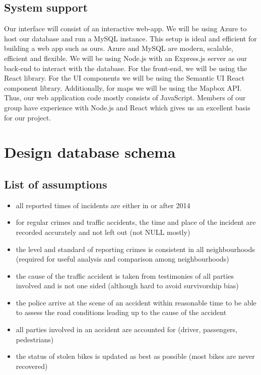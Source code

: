 \documentclass[12pt, a4paper]{article}
\begin{document}
\subsection*{System support}
Our interface will consist of an interactive web-app. We will be using Azure to host our database and run a MySQL instance. This setup is ideal and efficient for building a web app such as ours. Azure and MySQL are modern, scalable, efficient and flexible. We will be using Node.js with an Express.js server as our back-end to interact with the database. For the front-end, we will be using the React library. \color{blue}For the UI components we will be using the Semantic UI React component library. Additionally, for maps we will be using the Mapbox API. \color{black}Thus, our web application code mostly consists of JavaScript. Members of our group have experience with Node.js and React which gives us an excellent basis for our project. 

\section*{Design database schema}
\subsection*{List of assumptions}
\begin{itemize}
    \item all reported times of incidents are either in or after 2014
    \item for regular crimes and traffic accidents, the time and place of the incident are recorded accurately and not left out (not NULL mostly)
    \item the level and standard of reporting crimes is consistent in all neighbourhoods (required for useful analysis and comparison among neighbourhoods)
    \item the cause of the traffic accident is taken from testimonies of all parties involved and is not one sided (although hard to avoid survivorship bias)
    \item the police arrive at the scene of an accident within reasonable time to be able to assess the road conditions leading up to the cause of the accident
    \item all parties involved in an accident are accounted for (driver, passengers, pedestrians)
    \item the status of stolen bikes is updated as best as possible (most bikes are never recovered)
\end{itemize}
\color{blue}
\end{document}
